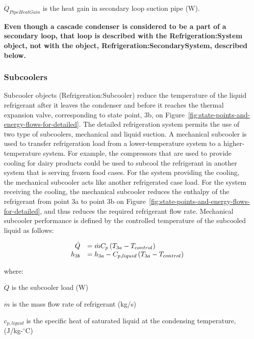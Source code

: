 \({\dot Q_{PipeHeatGain}}\) is the heat gain in secondary loop suction pipe (W).

\textbf{Even though a cascade condenser is considered to be a part of a secondary loop, that loop is described with the Refrigeration:System object, not with the object, Refrigeration:SecondarySystem, described below.}

\subsubsection{Subcoolers}\label{subcoolers}

Subcooler objects (Refrigeration:Subcooler) reduce the temperature of the liquid refrigerant after it leaves the condenser and before it reaches the thermal expansion valve, corresponding to state point, 3b, on Figure~\ref{fig:state-points-and-energy-flows-for-detailed}. The detailed refrigeration system permits the use of two type of subcoolers, mechanical and liquid suction. A mechanical subcooler is used to transfer refrigeration load from a lower-temperature system to a higher-temperature system. For example, the compressors that are used to provide cooling for dairy products could be used to subcool the refrigerant in another system that is serving frozen food cases. For the system providing the cooling, the mechanical subcooler acts like another refrigerated case load. For the system receiving the cooling, the mechanical subcooler reduces the enthalpy of the refrigerant from point 3a to point 3b on Figure~\ref{fig:state-points-and-energy-flows-for-detailed}, and thus reduces the required refrigerant flow rate. Mechanical subcooler performance is defined by the controlled temperature of the subcooled liquid as follows:

\begin{equation}
  \begin{array}{rl}
    \dot{Q} &= \dot{m} C_p \left(T_{3a} - T_{control}\right) \\
    h_{3b}  &= h_{3a} - C_{p,liquid} \left(T_{3a} - T_{control}\right)
  \end{array}
\end{equation}

where:

\(\dot Q\) is the subcooler load (W)

\(\dot m\) is the mass flow rate of refrigerant (kg/s)

\(c_{p,liquid}\) is the specific heat of saturated liquid at the condensing temperature, (J/kg-\(^{\circ}\)C)

